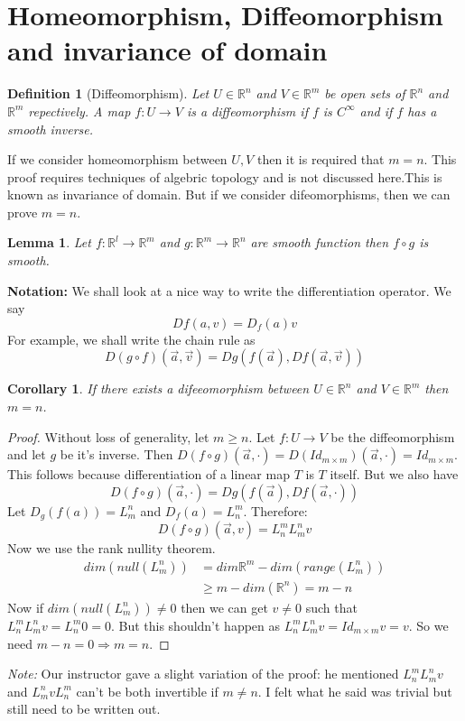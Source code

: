 \documentclass[oneside]{book}\twocolumn
\newtheorem{definition}[theorem]{Definition}
\newtheorem{lemma}[theorem]{Lemma}
\newtheorem{corollary}[theorem]{Corollary}
\begin{document}
\section{Homeomorphism, Diffeomorphism and invariance of domain}
\begin{definition}[Diffeomorphism]
Let $U\in\mathbb R^n$ and $V\in\mathbb R^m$ be open sets of $\mathbb R^n$ and $\mathbb R^m$ repectively. A map $f:U\to V$ is a diffeomorphism if $f$ is $C^\infty$ and if $f$ has a smooth inverse.
\end{definition}
If we consider homeomorphism between $U,V$ then it is required that $m=n$. This proof requires techniques of algebric topology and is not discussed here.This is known as invariance of domain. But if we consider difeomorphisms, then we can prove $m=n$.
\begin{lemma}
Let $f:\mathbb R^l\to\mathbb R^m$ and $g:\mathbb R^m\to\mathbb R^n$ are smooth function then $f\circ g$ is smooth. 
\end{lemma}
\textbf{Notation: }We shall look at a nice way to write the differentiation operator. We say
$$Df(a,v)=D_f(a)v$$
For example, we shall write the chain rule as
$$D(g\circ f)(\overrightarrow{a},\overrightarrow{v})=Dg(f(\overrightarrow{a}),Df(\overrightarrow{a},\overrightarrow{v}))$$
\begin{corollary}
If there exists a difeeomorphism between $U\in\mathbb R^n$ and $V\in\mathbb R^m$ then $m=n$.
\end{corollary}
\begin{proof}
Without loss of generality, let $m\geq n$. Let $f:U\to V$ be the diffeomorphism and let $g$ be it's inverse. Then $D(f\circ g)(\overrightarrow{a},\cdot)=D(Id_{m\times m})(\overrightarrow{a},\cdot)=Id_{m\times m}$. This follows because differentiation of a linear map $T$ is $T$ itself. But we also have
$$D(f\circ g)(\overrightarrow{a},\cdot)=Dg(f(\overrightarrow{a}),Df(\overrightarrow{a},\cdot))$$
Let $D_g(f(a))=L_{m}^n$ and $D_f(a)=L_{n}^m$. Therefore:
$$D(f\circ g)(\overrightarrow{a},v)=L_{n}^mL_m^nv$$
Now we use the rank nullity theorem. 
\begin{align*}
    dim(null(L_{m}^n))&=dim \mathbb{R}^m-dim(range(L_{m}^n))\\
    &\geq m-dim(\mathbb R^n)=m-n
\end{align*}
Now if $dim(null(L_{m}^n))\ne 0$ then we can get $v\ne 0$ such that $L_{n}^mL_m^nv=L_{n}^m0=0$. But this shouldn't happen as $L_{n}^mL_m^nv=Id_{m\times m}v=v$. So we need $m-n=0\Rightarrow m=n$.
\end{proof}
\textit{Note:} Our instructor gave a slight variation of the proof: he mentioned $L_{n}^mL_m^nv$ and $L_m^nvL_{n}^m$ can't be both invertible if $m\ne n$. I felt what he said was trivial but still need to be written out.
\end{document}

